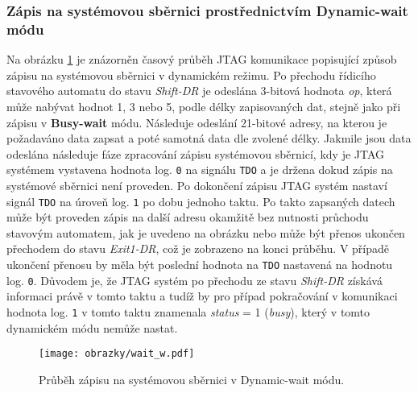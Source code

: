 \subsubsection{Zápis na systémovou sběrnici prostřednictvím Dynamic-wait módu} 
Na obrázku \ref{fig:wait_w} je znázorněn časový průběh \acs{JTAG} komunikace popisující způsob zápisu na systémovou sběrnici v dynamickém  režimu. Po přechodu řídicího stavového automatu do stavu \textit{Shift-DR} je odeslána 3-bitová hodnota \textit{op}, která může nabývat hodnot 1, 3 nebo 5, podle délky zapisovaných dat, stejně jako při zápisu v \textbf{Busy-wait} módu. Následuje odeslání 21-bitové adresy, na kterou je požadaváno data zapsat a poté samotná data dle zvolené délky. Jakmile jsou data odeslána následuje fáze zpracování zápisu systémovou sběrnicí, kdy je \acs{JTAG} systémem vystavena hodnota log. \texttt{0} na signálu \texttt{\acs{TDO}} a je držena dokud zápis na systémové sběrnici není proveden. Po dokončení zápisu \acs{JTAG} systém nastaví signál \texttt{\acs{TDO}} na úroveň log. \texttt{1} po dobu jednoho taktu. Po takto zapsaných datech může být proveden zápis na další adresu okamžitě bez nutnosti průchodu stavovým automatem, jak je uvedeno na obrázku nebo může být přenos ukončen přechodem do stavu \textit{Exit1-DR}, což je zobrazeno na konci průběhu. V případě ukončení přenosu by měla být poslední hodnota na \texttt{\acs{TDO}} nastavená na hodnotu log. \texttt{0}. Důvodem je, že \acs{JTAG} systém po přechodu ze stavu \textit{Shift-DR} získává informaci právě v tomto taktu a tudíž by pro případ pokračování v komunikaci hodnota log. \texttt{1} v tomto taktu znamenala \textit{status} = 1 (\textit{busy}), který v tomto dynamickém módu nemůže nastat.

\begin{figure}[!h]
  \begin{center}
    \texttt{[image: obrazky/wait\_w.pdf]}
  \end{center}
  \caption{Průběh zápisu na systémovou sběrnici v Dynamic-wait módu.}
	\label{fig:wait_w}
\end{figure}

